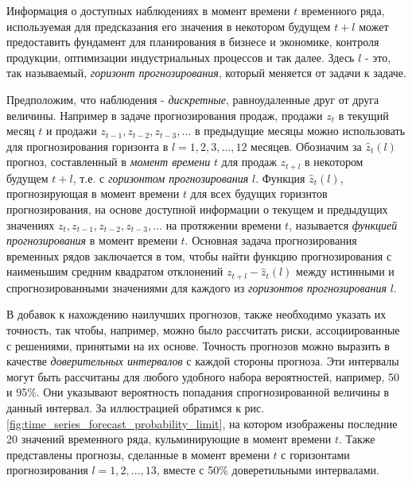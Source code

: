 
Информация о доступных наблюдениях в момент времени $t$ временного ряда, 
используемая для предсказания его значения в некотором будущем $t+l$ может 
предоставить фундамент для планирования в бизнесе и экономике, контроля продукции, 
оптимизации индустриальных процессов и так далее. Здесь $l$ - это, так называемый, 
\textit{горизонт прогнозирования}, который меняется от задачи к задаче.

Предположим, что наблюдения - \textit{дискретные}, равноудаленные друг от друга величины. 
Например в задаче прогнозирования продаж, продажи $z_t$ в текущий месяц $t$ и продажи 
$z_{t-1}, z_{t-2}, z_{t-3}, ...$ в предыдущие месяцы можно использовать для 
прогнозирования горизонта в $l = 1, 2, 3, ..., 12$ месяцев. Обозначим за $\hat{z}_t (l)$ 
прогноз, составленный в \textit{момент времени} $t$ для продаж $z_{t+l}$ в некотором будущем $t+l$, т.е.
с \textit{горизонтом прогнозирования} $l$. Функция $\hat{z}_t (l)$, прогнозирующая в момент времени 
$t$ для всех будущих горизнтов прогнозирования, на основе доступной информации о 
текущем и предыдущих значениях $z_t, z_{t-1}, z_{t-2}, z_{t-3}, ...$ на протяжении времени $t$, 
называется \textit{функцией прогнозирования} в момент времени $t$. Основная задача 
прогнозирования временных рядов заключается в том, чтобы найти функцию прогнозирования с 
наименьшим средним квадратом отклонений $z_{t+l} - \hat{z}_t (l)$ между истинными и 
спрогнозированными значениями для каждого из \textit{горизонтов прогнозирования} $l$. 

В добавок к нахождению наилучших прогнозов, также необходимо указать их точность, так 
чтобы, например, можно было рассчитать риски, ассоциированные с решениями, принятыми на 
их основе. Точность прогнозов можно выразить в качестве \textit{доверительных интервалов} 
с каждой стороны прогноза. Эти интервалы могут быть рассчитаны для любого удобного набора 
вероятностей, например, 50 и 95\%. Они указывают вероятность попадания спрогнозированной 
величины в данный интервал. За иллюстрацией обратимся к рис. \ref{fig:time_series_forecast_probability_limit}, 
на котором изображены последние 20 значений временного ряда, кульминирующие в момент времени $t$. 
Также представлены прогнозы, сделанные в момент времени $t$ с горизонтами прогнозирования 
$l = 1, 2, ..., 13$, вместе с 50\% доверетильными интервалами.

